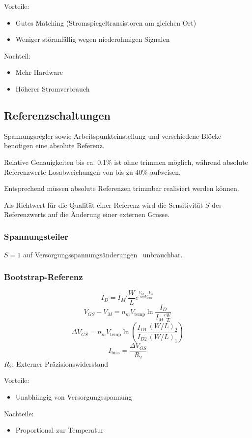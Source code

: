 Vorteile:
\begin{itemize}
    \item Gutes Matching (Stromspiegeltransistoren am gleichen Ort)
    \item Weniger störanfällig wegen niederohmigen Signalen
\end{itemize}
Nachteil:
\begin{itemize}
    \item Mehr Hardware
    \item Höherer Stromverbrauch
\end{itemize}

\subsection{Referenzschaltungen}
Spannungsregler sowie Arbeitspunkteinstellung und verschiedene Blöcke benötigen eine absolute Referenz.

Relative Genauigkeiten bis ca. 0.1\% ist ohne trimmen möglich, während absolute Referenzwerte Losabweichungen von bis zu 40\% aufweisen.

Entsprechend müssen absolute Referenzen trimmbar realisiert werden können.

Als Richtwert für die Qualität einer Referenz wird die Sensitivität $S$ des Referenzwerts auf die Änderung einer externen Grösse.

\subsubsection{Spannungsteiler}
$S = 1$ auf Versorgungsspannungsänderungen \textrightarrow\ unbrauchbar.

\subsubsection{Bootstrap-Referenz}
\[
    I_D = I_M' \frac{W}{L} e^{\frac{V_{GS}-V_M}{n m V_\mathrm{temp}}}
\]
\[
    V_{GS} - V_M = n_m V_\mathrm{temp} \ln{\frac{I_D}{I_M' \frac{W}{L}}}
\]
\[
    \Delta V_{GS} = n_m V_\mathrm{temp} \ln\left(\frac{I_{D1}}{I_{D2}} \frac{(W/L)_2}{(W/L)_1}\right)
\]
\[
    I_\mathrm{bias} = \frac{\Delta V_{GS}}{R_2}
\]
$R_2$: Externer Präzisionswiderstand

Vorteile:
\begin{itemize}
    \item Unabhängig von Versorgungsspannung
\end{itemize}
Nachteile:
\begin{itemize}
    \item Proportional zur Temperatur
\end{itemize}

